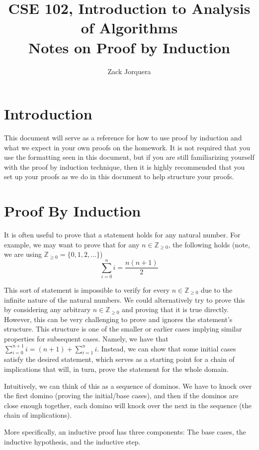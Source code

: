 \documentclass{article}
\title{CSE 102, Introduction to Analysis of Algorithms\\
Notes on Proof by Induction}
\author{Zack Jorquera}
\date{}
\newcommand{\ZZ}{\mathbb{Z}_{\geq 0}}
\theoremstyle{plain}
\theoremstyle{definition}
\begin{document}
\maketitle

\section{Introduction}

This document will serve as a reference for how to use proof by induction and what we expect in your own proofs on the homework. It is not required that you use the formatting seen in this document, but if you are still familiarizing yourself with the proof by induction technique, then it is highly recommended that you set up your proofs as we do in this document to help structure your proofs.

\section{Proof By Induction}

It is often useful to prove that a statement holds for any natural number. For example, we may want to prove that for any \(n \in \ZZ\), the following holds (note, we are using \(\ZZ = \{0, 1, 2, \dotsc\}\))
\[\sum_{i=0}^n i = \frac{n(n+1)}{2}\]

This sort of statement is impossible to verify for every \(n \in \ZZ\) due to the infinite nature of the natural numbers. We could alternatively try to prove this by considering any arbitrary \(n \in \ZZ\) and proving that it is true directly. However, this can be very challenging to prove and ignores the statement's structure. This structure is one of the smaller or earlier cases implying similar properties for subsequent cases. Namely, we have that \(\sum_{i=0}^{n+1} i = (n+1) + \sum_{i=1}^n i\). Instead, we can show that some initial cases satisfy the desired statement, which serves as a starting point for a chain of implications that will, in turn, prove the statement for the whole domain.

Intuitively, we can think of this as a sequence of dominos. We have to knock over the first domino (proving the initial/base cases), and then if the dominos are close enough together, each domino will knock over the next in the sequence (the chain of implications).

More specifically, an inductive proof has three components: The base cases, the inductive hypothesis, and the inductive step.
\end{document}

